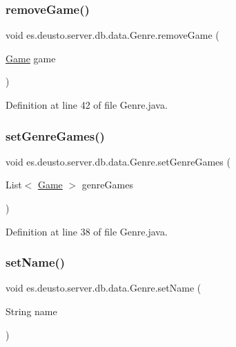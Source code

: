 \subsubsection{\texorpdfstring{remove\+Game()}{removeGame()}}
{\footnotesize\ttfamily void es.\+deusto.\+server.\+db.\+data.\+Genre.\+remove\+Game (\begin{DoxyParamCaption}\item[{\hyperlink{classes_1_1deusto_1_1server_1_1db_1_1data_1_1_game}{Game}}]{game }\end{DoxyParamCaption})}



Definition at line 42 of file Genre.\+java.

\mbox{\label{classes_1_1deusto_1_1server_1_1db_1_1data_1_1_genre_a05616f4c15dc04ae0d0136483bfc1c83}} 
\subsubsection{\texorpdfstring{set\+Genre\+Games()}{setGenreGames()}}
{\footnotesize\ttfamily void es.\+deusto.\+server.\+db.\+data.\+Genre.\+set\+Genre\+Games (\begin{DoxyParamCaption}\item[{List$<$ \hyperlink{classes_1_1deusto_1_1server_1_1db_1_1data_1_1_game}{Game} $>$}]{genre\+Games }\end{DoxyParamCaption})}



Definition at line 38 of file Genre.\+java.

\mbox{\label{classes_1_1deusto_1_1server_1_1db_1_1data_1_1_genre_a7e2273804775882fc0d73ba9dea2e3fc}} 
\subsubsection{\texorpdfstring{set\+Name()}{setName()}}
{\footnotesize\ttfamily void es.\+deusto.\+server.\+db.\+data.\+Genre.\+set\+Name (\begin{DoxyParamCaption}\item[{String}]{name }\end{DoxyParamCaption})}




